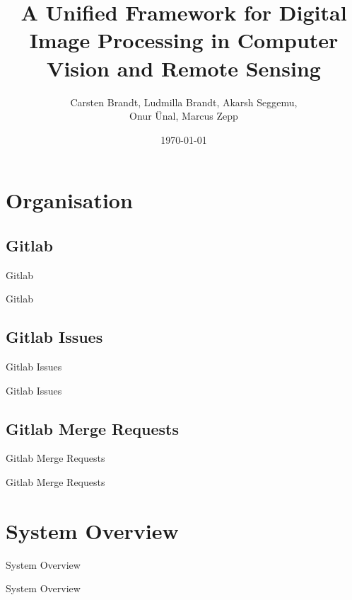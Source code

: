 \documentclass{beamer}
\title{A Unified Framework for Digital Image Processing in Computer Vision and Remote Sensing}
\author{
Carsten Brandt,
Ludmilla Brandt,
Akarsh Seggemu,\\
Onur Ünal,
Marcus Zepp
}
\date{\today}
\begin{document}
\begin{frame}
	\titlepage
\end{frame}

\begin{frame}
	\tableofcontents  \pnote{}
\end{frame}


\section{Organisation}
\subsection{Gitlab}
\begin{frame}{Gitlab}

	Gitlab

\end{frame}

\subsection{Gitlab Issues}
\begin{frame}{Gitlab Issues}

	Gitlab Issues

\end{frame}

\subsection{Gitlab Merge Requests}
\begin{frame}{Gitlab Merge Requests}

	Gitlab Merge Requests

\end{frame}


\section{System Overview}
\begin{frame}{System Overview}

System Overview

\end{frame}
\end{document}
